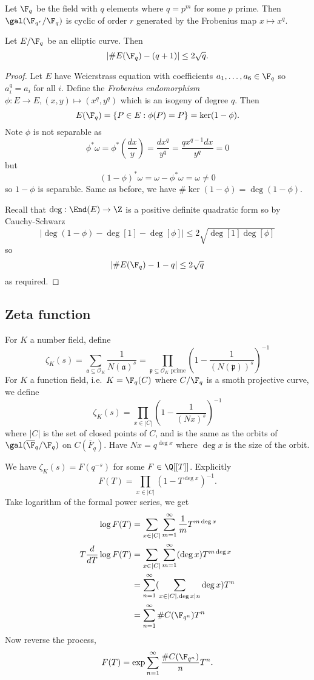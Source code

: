 \documentclass[a4paper]{article}
\theoremstyle{definition}
\renewcommand*{\O}{\mathcal{O}}
\begin{document}
Let \(\F_q\) be the field with \(q\) elements where \(q = p^m\) for some \(p\) prime. Then \(\gal(\F_{q^r}/\F_q)\) is cyclic of order \(r\) generated by the Frobenius map \(x \mapsto x^q\).

\begin{theorem}[Hasse]
  Let \(E/\F_q\) be an elliptic curve. Then
  \[
    |\#E(\F_q) - (q + 1)| \leq 2 \sqrt q.
  \]
\end{theorem}

\begin{proof}
  Let \(E\) have Weierstrass equation with coefficients \(a_1, \dots, a_6 \in \F_q\) so \(a_i^q = a_i\) for all \(i\). Define the \emph{Frobenius endomorphism} \(\phi: E \to E, (x, y) \mapsto (x^q, y^q)\) which is an isogeny of degree \(q\). Then
  \[
    E(\F_q) = \{P \in E: \phi(P) = P\} = \ker (1 - \phi).
  \]
  Note \(\phi\) is not separable as
  \[
    \phi^*\omega = \phi^* (\frac{dx}{y}) = \frac{d x^q}{y^q} = \frac{qx^{q - 1} dx}{y^q} = 0
  \]
  but
  \[
    (1 - \phi)^* \omega = \omega - \phi^* \omega = \omega \ne 0
  \]
  so \(1 - \phi\) is separable. Same as before, we have \(\# \ker (1 - \phi) = \deg (1 - \phi)\).

  Recall that \(\deg: \End(E) \to \Z\) is a positive definite quadratic form so by Cauchy-Schwarz
  \[
    |\deg (1 - \phi) - \deg [1] - \deg [\phi]| \leq 2 \sqrt{\deg [1] \deg [\phi]}
  \]
  so
  \[
    |\#E(\F_q) - 1 - q| \leq 2 \sqrt q
  \]
  as required.
\end{proof}

\subsection{Zeta function}

For \(K\) a number field, define
\[
  \zeta_K(s) = \sum_{\mathfrak a \subseteq \O_K} \frac{1}{N(\mathfrak a)^s} = \prod_{\mathfrak p \subseteq \O_K \text{ prime}} \left( 1- \frac{1}{(N(\mathfrak p))^s} \right)^{-1}
\]
For \(K\) a function field, i.e.\ \(K = \F_q(C)\) where \(C/\F_q\) is a smoth projective curve, we define
\[
  \zeta_K(s) = \prod_{x \in |C|} \left(1 - \frac{1}{(Nx)^s} \right)^{-1}
\]
where \(|C|\) is the set of closed points of \(C\), and is the same as the orbits of \(\gal(\overline \F_q/\F_q)\) on \(C(\overline F_q)\). Have \(Nx = q^{\deg x}\) where \(\deg x\) is the size of the orbit.

We have \(\zeta_K(s) = F(q^{-s})\) for some \(F \in \Q[[T]]\). Explicitly
\[
  F(T) = \prod_{x \in |C|} (1 - T^{\deg x})^{-1}.
\]
Take logarithm of the formal power series, we get
\begin{align*}
  \log F(T) &= \sum_{x \in |C|} \sum_{m = 1}^\infty \frac{1}{m} T^{m \deg x} \\
  T \frac{d}{dT} \log F(T) &= \sum_{x \in |C|} \sum_{m = 1}^\infty (\deg x) T^{m \deg x} \\
            &= \sum_{n = 1}^\infty (\sum_{x \in |C|, \deg x|n} \deg x) T^n \\
            &= \sum_{n = 1}^\infty \# C(\F_{q^n}) T^n
\end{align*}
Now reverse the process,
\[
  F(T) = \exp \sum_{n = 1}^\infty \frac{\# C(\F_{q^n})}{n} T^n.
\]
\end{document}
